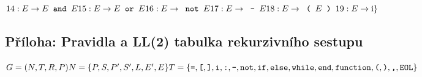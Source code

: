 \documentclass[12pt,a4paper,titlepage,final]{article}
\begin{document}
\begin{landscape}
\begin{minipage}{0.17\linewidth}
\begin{math}
14: E \rightarrow E \texttt{ and } E \\
15: E \rightarrow E \texttt{ or } E \\
16: E \rightarrow \texttt{ not } E \\
17: E \rightarrow \texttt{ - } E \\
18: E \rightarrow \texttt{ ( } E \texttt{ ) } \\
19: E \rightarrow \text{i} \\
\} \\ \\ \\
\end{math}
\end{minipage}
\end{landscape}

\begin{landscape} %
\section{Příloha: Pravidla a LL(2) tabulka rekurzivního sestupu} \label{rekurzivnisestup}

\begin{minipage}{\linewidth} %
\begin{large}

\begin{math}
G = (N,T,R,P) \\
N = \{ P, S, P', S', L, E', E \} \\
T = \{ \texttt{=}, \texttt{[}, \texttt{]}, \texttt{i}, \texttt{:}, \texttt{-}, \texttt{not}, \texttt{if}, \texttt{else}, \texttt{while}, \texttt{end}, \texttt{function}, \texttt{(}, \texttt{)}, \texttt{,}, \texttt{EOL} \} \\
\end{math}


\end{large}
\end{minipage}
\end{landscape}
\end{document}
